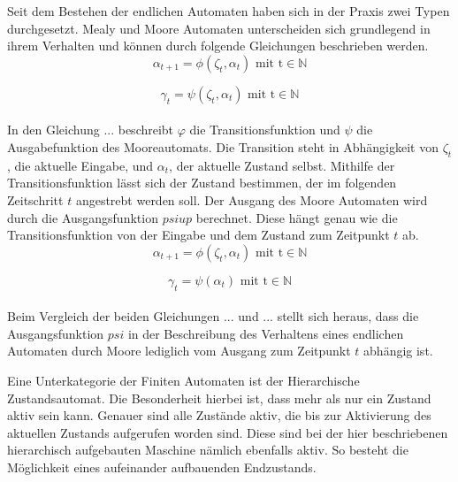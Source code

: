	Seit dem Bestehen der endlichen Automaten haben sich in der Praxis zwei Typen durchgesetzt. Mealy und Moore Automaten unterscheiden sich grundlegend in ihrem Verhalten und können durch folgende Gleichungen beschrieben werden.\\
	
	\begin{equation}
		\alpha_{t+1}=\phi(\zeta_t,\alpha_t)\text{    mit    t}\in\mathbb{N}
		\label{eq: transferfct}
	\end{equation}

	\begin{equation}
		\gamma_t=\psi(\zeta_t,\alpha_t)\text{    mit    t}\in\mathbb{N}
		\label{eq: transferfct}
	\end{equation}
	\\
	In den Gleichung ... beschreibt $\varphi$ die Transitionsfunktion und $\psi$ die Ausgabefunktion des Mooreautomats. Die Transition steht in Abhängigkeit von $\zeta_t $, die aktuelle Eingabe, und $\alpha_t$, der aktuelle Zustand selbst. Mithilfe der Transitionsfunktion lässt sich der Zustand bestimmen, der im folgenden Zeitschritt $t$ angestrebt werden soll. Der Ausgang des Moore Automaten wird durch die Ausgangsfunktion $psiup$ berechnet. Diese hängt genau wie die Transitionsfunktion von der Eingabe und dem Zustand zum Zeitpunkt $t$ ab. \\
	
	\begin{equation}
		\alpha_{t+1}=\phi(\zeta_t,\alpha_t)\text{    mit    t}\in\mathbb{N}
		\label{eq: transferfct}
	\end{equation}
	
	\begin{equation}
		\gamma_t=\psi(\alpha_t)\text{    mit    t}\in\mathbb{N}
		\label{eq: transferfct}
	\end{equation}
	\\
	
	Beim Vergleich der beiden Gleichungen ... und ... stellt sich heraus, dass die Ausgangsfunktion $psi$ in der Beschreibung des Verhaltens eines endlichen Automaten durch Moore lediglich vom Ausgang zum Zeitpunkt $t$ abhängig ist.
	
	Eine Unterkategorie der Finiten Automaten ist der Hierarchische Zustandsautomat. Die Besonderheit hierbei ist, dass mehr als nur ein Zustand aktiv sein kann. Genauer sind alle Zustände aktiv, die bis zur Aktivierung des aktuellen Zustands aufgerufen worden sind. Diese sind bei der hier beschriebenen hierarchisch aufgebauten Maschine nämlich ebenfalls aktiv. So besteht die Möglichkeit eines aufeinander aufbauenden Endzustands. 
	

